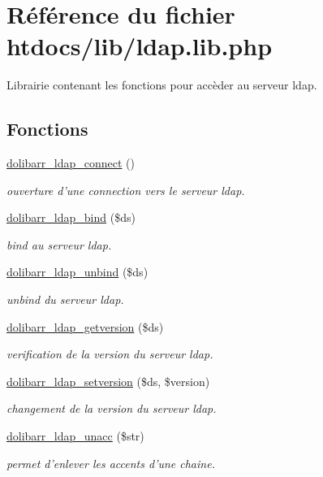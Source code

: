 \hypertarget{ldap_8lib_8php}{
\section{R\'{e}f\'{e}rence du fichier htdocs/lib/ldap.lib.php}
\label{ldap_8lib_8php}
}
Librairie contenant les fonctions pour acc\`{e}der au serveur ldap.  


\subsection*{Fonctions}
\begin{CompactItemize}
\item 
\hyperlink{ldap_8lib_8php_a0}{dolibarr\_\-ldap\_\-connect} ()
\begin{CompactList}\small\item\em ouverture d'une connection vers le serveur ldap. \item\end{CompactList}\item 
\hyperlink{ldap_8lib_8php_a1}{dolibarr\_\-ldap\_\-bind} (\$ds)
\begin{CompactList}\small\item\em bind au serveur ldap. \item\end{CompactList}\item 
\hyperlink{ldap_8lib_8php_a2}{dolibarr\_\-ldap\_\-unbind} (\$ds)
\begin{CompactList}\small\item\em unbind du serveur ldap. \item\end{CompactList}\item 
\hyperlink{ldap_8lib_8php_a3}{dolibarr\_\-ldap\_\-getversion} (\$ds)
\begin{CompactList}\small\item\em verification de la version du serveur ldap. \item\end{CompactList}\item 
\hyperlink{ldap_8lib_8php_a4}{dolibarr\_\-ldap\_\-setversion} (\$ds, \$version)
\begin{CompactList}\small\item\em changement de la version du serveur ldap. \item\end{CompactList}\item 
\hyperlink{ldap_8lib_8php_a5}{dolibarr\_\-ldap\_\-unacc} (\$str)
\begin{CompactList}\small\item\em permet d'enlever les accents d'une chaine. \item\end{CompactList}\end{CompactItemize}


